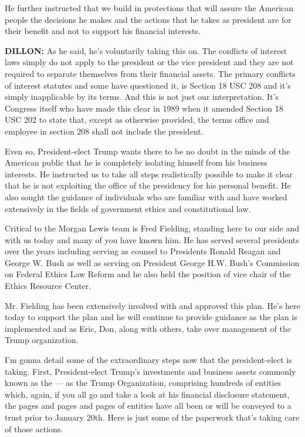 He further instructed that we build in protections that will assure the
American people the decisions he makes and the actions that he takes as
president are for their benefit and not to support his financial
interests.

\textbf{DILLON:} As he said, he's voluntarily taking this on. The
conflicts of interest laws simply do not apply to the president or the
vice president and they are not required to separate themselves from
their financial assets. The primary conflicts of interest statutes and
some have questioned it, is Section 18 USC 208 and it's simply
inapplicable by its terms. And this is not just our interpretation. It's
Congress itself who have made this clear in 1989 when it amended Section
18 USC 202 to state that, except as otherwise provided, the terms office
and employee in section 208 shall not include the president.

Even so, President-elect Trump wants there to be no doubt in the minds
of the American public that he is completely isolating himself from his
business interests. He instructed us to take all steps realistically
possible to make it clear that he is not exploiting the office of the
presidency for his personal benefit. He also sought the guidance of
individuals who are familiar with and have worked extensively in the
fields of government ethics and constitutional law.

Critical to the Morgan Lewis team is Fred Fielding, standing here to our
side and with us today and many of you have known him. He has served
several presidents over the years including serving as counsel to
Presidents Ronald Reagan and George W. Bush as well as serving on
President George H.W. Bush's Commission on Federal Ethics Law Reform and
he also held the position of vice chair of the Ethics Resource Center.

Mr. Fielding has been extensively involved with and approved this plan.
He's here today to support the plan and he will continue to provide
guidance as the plan is implemented and as Eric, Don, along with others,
take over management of the Trump organization.

I'm gonna detail some of the extraordinary steps now that the
president-elect is taking. First, President-elect Trump's investments
and business assets commonly known as the --- as the Trump Organization,
comprising hundreds of entities which, again, if you all go and take a
look at his financial disclosure statement, the pages and pages and
pages of entities have all been or will be conveyed to a trust prior to
January 20th. Here is just some of the paperwork that's taking care of
those actions.

